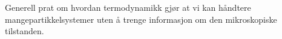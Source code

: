 \documentclass[a4paper,norsk,12pt]{book}
\begin{document}
\tableofcontents

\pagebreak

Generell prat om hvordan termodynamikk gjør at vi kan håndtere mangepartikkelsystemer uten å trenge informasjon om den mikroskopiske tilstanden.





\appendix

\end{document}
